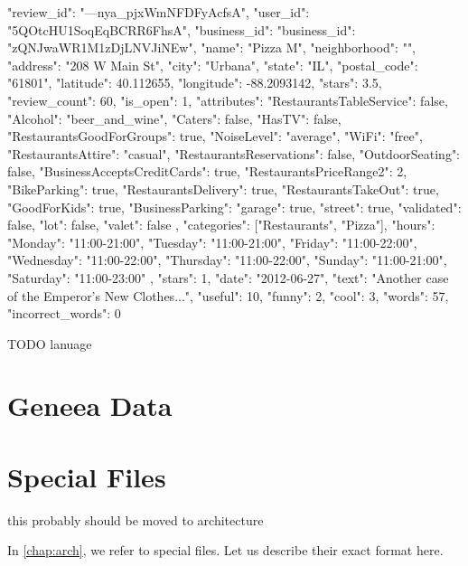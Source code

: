 \begin{code}
{
	"review_id": "---nya_pjxWmNFDFyAcfsA",
	"user_id": "5QOtcHU1SoqEqBCRR6FhsA",
	"business_id": {
		"business_id": "zQNJwaWR1M1zDjLNVJiNEw",
		"name": "Pizza M",
		"neighborhood": "",
		"address": "208 W Main St",
		"city": "Urbana",
		"state": "IL",
		"postal_code": "61801",
		"latitude": 40.112655,
		"longitude": -88.2093142,
		"stars": 3.5,
		"review_count": 60,
		"is_open": 1,
		"attributes": {
			"RestaurantsTableService": false,
			"Alcohol": "beer_and_wine",
			"Caters": false,
			"HasTV": false,
			"RestaurantsGoodForGroups": true,
			"NoiseLevel": "average",
			"WiFi": "free",
			"RestaurantsAttire": "casual",
			"RestaurantsReservations": false,
			"OutdoorSeating": false,
			"BusinessAcceptsCreditCards": true,
			"RestaurantsPriceRange2": 2,
			"BikeParking": true,
			"RestaurantsDelivery": true,
			"RestaurantsTakeOut": true,
			"GoodForKids": true,
			"BusinessParking": {
				"garage": true,
				"street": true,
				"validated": false,
				"lot": false,
				"valet": false
			}
		},
		"categories": ["Restaurants", "Pizza"],
		"hours": {
			"Monday": "11:00-21:00",
			"Tuesday": "11:00-21:00",
			"Friday": "11:00-22:00",
			"Wednesday": "11:00-22:00",
			"Thursday": "11:00-22:00",
			"Sunday": "11:00-21:00",
			"Saturday": "11:00-23:00"
		}
	},
	"stars": 1,
	"date": "2012-06-27",
	"text": "Another case of the Emperor's New Clothes...",
	"useful": 10,
	"funny": 2,
	"cool": 3,
	"words": 57,
	"incorrect_words": 0
}
\end{code}



TODO lanuage


\section{Geneea Data}




\section{Special Files}

this probably should be moved to architecture

In \autoref{chap:arch}, we refer to special files.
Let us describe their exact format here.

